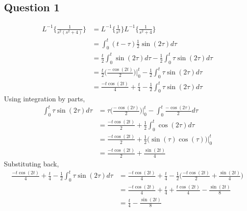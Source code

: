 \documentclass[titlepage]{article}
\begin{document}
\subsection*{Question 1}
\begin{align*}
    L^{-1}\{\frac{1}{s^2(s^2+4)}\} &= L^{-1}\{\frac{1}{s^2}\}L^{-1}\{\frac{1}{s^2+4}\} \\
    &= \int_0^t (t-\tau) \frac{1}{2} \sin(2\tau) d\tau \\
    &= \frac{t}{2} \int_0^t \sin(2\tau) d\tau - \frac{1}{2}\int_0^t \tau \sin(2\tau) d\tau \\
    &= \frac{t}{2}\bigg(\frac{-\cos(2t)}{2}\bigg)\bigg|_0^t - \frac{1}{2} \int_0^t \tau \sin(2\tau) d\tau \\
    &= \frac{-t\cos(2t)}{4} + \frac{t}{4} - \frac{1}{2} \int_0^t \tau \sin(2\tau) d\tau
\end{align*}
Using integration by parts,
\begin{align*}
    \int_0^t \tau \sin(2\tau) d\tau &= \tau \bigg(\frac{-\cos(2\tau)}{2}\bigg)\bigg|_0^t - \int_0^t \frac{-\cos(2\tau)}{2} d\tau \\
    &= \frac{-t\cos(2t)}{2} + \frac{1}{2} \int_0^t \cos(2\tau) d\tau \\
    &= \frac{-t\cos(2t)}{2} + \frac{1}{2} \bigg( \sin(\tau)\cos(\tau) \bigg) \bigg|_0^t\\
    &= \frac{-t\cos(2t)}{2} + \frac{\sin(2t)}{4}
\end{align*}
Substituting back,
\begin{align*}
    \frac{-t\cos(2t)}{4} + \frac{t}{4} - \frac{1}{2} \int_0^t \tau \sin(2\tau) d\tau &= \frac{-t\cos(2t)}{4} + \frac{t}{4} - \frac{1}{2} \bigg( \frac{-t\cos(2t)}{2} + \frac{\sin(2t)}{4} \bigg) \\
    &= \frac{-t\cos(2t)}{4} + \frac{t}{4} + \frac{t\cos(2t)}{4} - \frac{\sin(2t)}{8} \\
    &= \frac{t}{4} - \frac{\sin(2t)}{8}
\end{align*}
\end{document}
